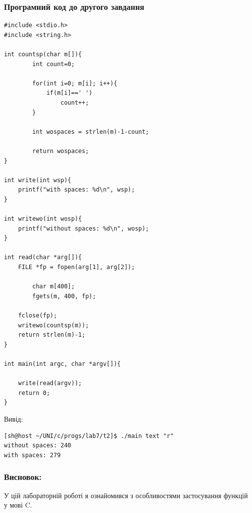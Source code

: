 \documentclass[12pt]{extreport}
\begin{document}
\subsubsection*{Програмний код до другого завдання}
\begin{lstlisting}[frame=single]
#include <stdio.h>
#include <string.h>

int countsp(char m[]){
		int count=0;

		for(int i=0; m[i]; i++){
			if(m[i]==' ')
				count++;
		}

		int wospaces = strlen(m)-1-count;

		return wospaces;
}

int write(int wsp){
	printf("with spaces: %d\n", wsp);
}

int writewo(int wosp){
	printf("without spaces: %d\n", wosp);
}

int read(char *arg[]){
	FILE *fp = fopen(arg[1], arg[2]);

		char m[400];
		fgets(m, 400, fp);

	fclose(fp);
	writewo(countsp(m));
	return strlen(m)-1;
}

int main(int argc, char *argv[]){

	write(read(argv));
	return 0;
}
\end{lstlisting}

Вивід:
\begin{lstlisting}
[sh@host ~/UNI/c/progs/lab7/t2]$ ./main text "r"
without spaces: 240
with spaces: 279
\end{lstlisting}

\subsubsection*{Висновок:}
У цій лабораторній роботі я ознайомився з особливостями
застосування функцій у мові C.
\end{document}
